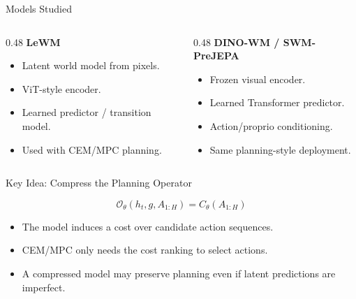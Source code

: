 \documentclass[aspectratio=169,11pt]{beamer}
\newcommand{\Otheta}{\mathcal{O}_{\theta}}
\begin{document}
\begin{frame}{Models Studied}

    \begin{columns}[T,totalwidth=\textwidth]
        \begin{column}{0.48\textwidth}
            \textbf{LeWM}
            \begin{itemize}
                \item Latent world model from pixels.
                \item ViT-style encoder.
                \item Learned predictor / transition model.
                \item Used with CEM/MPC planning.
            \end{itemize}
        \end{column}

        \begin{column}{0.48\textwidth}
            \textbf{DINO-WM / SWM-PreJEPA}
            \begin{itemize}
                \item Frozen visual encoder.
                \item Learned Transformer predictor.
                \item Action/proprio conditioning.
                \item Same planning-style deployment.
            \end{itemize}
        \end{column}
    \end{columns}

\end{frame}

\begin{frame}{Key Idea: Compress the Planning Operator}

    \[
        \Otheta(h_t, g, A_{1:H}) = C_\theta(A_{1:H})
    \]

    \vspace{1em}

    \begin{itemize}
        \item The model induces a cost over candidate action sequences.
        \item CEM/MPC only needs the cost ranking to select actions.
        \item A compressed model may preserve planning even if latent predictions are imperfect.
    \end{itemize}
\end{frame}
\end{document}
